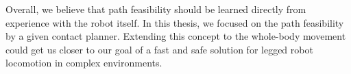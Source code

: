 Overall, we believe that path feasibility should be learned directly from experience with the robot itself.
In this thesis, we focused on the path feasibility by a given contact planner. Extending this concept to the whole-body movement could get us closer to our goal of a fast and safe solution for legged robot locomotion in complex environments.

